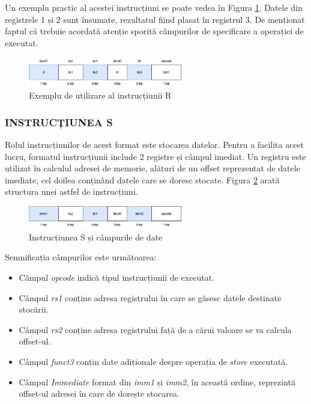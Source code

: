 \documentclass[12pt]{article}
\begin{document}
Un exemplu practic al acestei instrucțiuni se poate vedea în Figura \ref{Figura:11}. Datele din registrele 1 și 2 sunt însumate, rezultatul fiind plasat în registrul 3. De menționat faptul că trebuie acordată atenție sporită câmpurilor de specificare a operației de executat.
\newpage
 \begin{figure}[h!]
 \includegraphics[width=0.6\textwidth]{rtypeexample.png}
 \centering
 \caption{Exemplu de utilizare al instrucțiunii R}
 \label{Figura:11}
 \end{figure}

\subsubsection{INSTRUCȚIUNEA S}
Rolul instrucțiunilor de acest format este stocarea datelor. Pentru a facilita acest lucru, formatul instrucțiunii include 2 registre și câmpul imediat. Un registru este utilizat în calculul adresei de memorie, alături de un offset reprezentat de datele imediate, cel doilea conținând datele care se doresc stocate. Figura \ref{Figura:12} arată structura unei astfel de instrucțiuni.
 \begin{figure}[h!]
 \includegraphics[width=0.6\textwidth]{stype.png}
 \centering
 \caption{Instrucțiunea S și câmpurile de date}
 \label{Figura:12}
 \end{figure}
 
Semnificația câmpurilor este următoarea:
 \begin{itemize}
\item Câmpul \textit{opcode} indică tipul instrucțiunii de executat.
\item Câmpul \textit{rs1} conține adresa registrului în care se găsesc datele destinate stocării.
\item Câmpul \textit{rs2} conține adresa registrului față de a cărui valoare se va calcula offset-ul.
\item Câmpul \textit{funct3} conțin date adiționale despre operația de \textit{store} executată.
\item Câmpul \textit{Immediate} format din \textit{imm1} și \textit{imm2}, în această ordine,  reprezintă offset-ul adresei în care de dorește stocarea.
\end{itemize}
\end{document}
